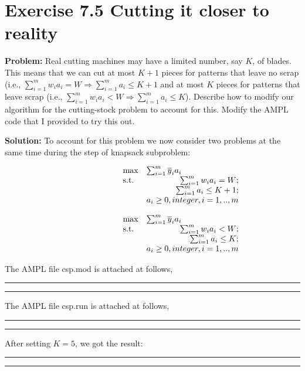 \section{Exercise 7.5 Cutting it closer to reality}
\textbf{Problem:} Real cutting machines may have a limited number, say $K$, of blades. This means that we can cut at most $K+1$ pieces for patterns that leave no scrap (i.e., $\sum_{i=1}^{m} w_ia_i=W \Rightarrow \sum_{i=1}^{m} a_i \leq K+1$ and at most $K$ pieces for patterns that leave scrap (i.e., $\sum_{i=1}^{m} w_ia_i<W \Rightarrow \sum_{i=1}^{m} a_i \leq K$). Describe how to modify our algorithm for the cutting-stock problem to account for this. Modify the AMPL code that I provided to try this out.

\textbf{Solution:} 
To account for this problem we now consider two problems at the same time during the step of knapsack subproblem:

\begin{equation}
\label{eq: kpeq}
  \begin{array}{lrcll}
    \max
    & \multicolumn{4}{l}{\sum_{i=1}^{m} \overline{y}_ia_i} \\
    \text{s.t.}
    & \sum_{i=1}^{m} w_ia_i=W;\\
    & \sum_{i=1}^{m} a_i \leq K+1;\\
    & a_i\geq0, integer, i=1,..,m
  \end{array}
\end{equation}

\begin{equation}
\label{eq: kpleq}
  \begin{array}{lrcll}
    \max
    & \multicolumn{4}{l}{\sum_{i=1}^{m} \overline{y}_ia_i} \\
    \text{s.t.}
    & \sum_{i=1}^{m} w_ia_i<W;\\
    & \sum_{i=1}^{m} a_i \leq K;\\
    & a_i\geq0, integer, i=1,..,m
  \end{array}
\end{equation}

The AMPL file csp.mod is attached at follows,
\bigskip
\hrule 
\small

\normalsize
\hrule
\bigskip

The AMPL file csp.run is attached at follows,
\bigskip
\hrule 
\small

\normalsize
\hrule
\bigskip

After setting $K=5$, we got the result:

\bigskip
\hrule 
\small

\normalsize
\hrule
\bigskip